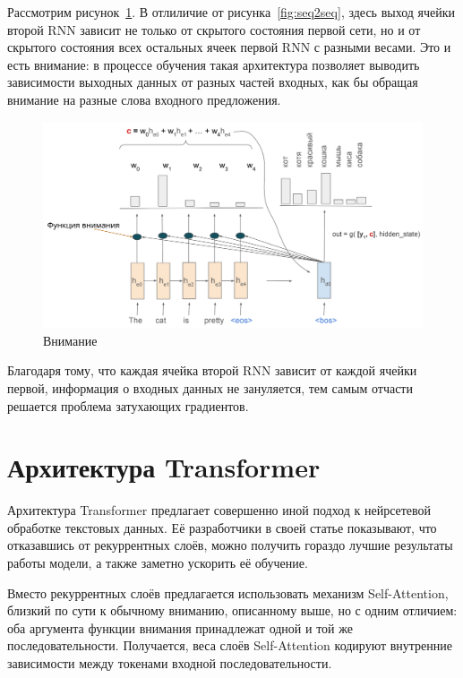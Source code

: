 Рассмотрим рисунок \ref*{fig:attention}. В отлиличие от рисунка \ref*{fig:seq2seq}, здесь выход ячейки второй RNN зависит не только от скрытого состояния первой сети, но и от скрытого состояния всех остальных ячеек первой RNN с разными весами. Это и есть внимание: в процессе обучения такая архитектура позволяет выводить зависимости выходных данных от разных частей входных, как бы обращая внимание на разные слова входного предложения.

\begin{figure}[h]
    \centering
    \includegraphics[width=\textwidth]{../inc/images/attention.png}
    \caption{Внимание}
    \label{fig:attention}
\end{figure}

Благодаря тому, что каждая ячейка второй RNN зависит от каждой ячейки первой, информация о входных данных не зануляется, тем самым отчасти решается проблема затухающих градиентов.

\section{Архитектура Transformer}

Архитектура Transformer предлагает совершенно иной подход к нейрсетевой обработке текстовых данных. Её разработчики в своей статье \cite{art:transformer} показывают, что отказавшись от рекуррентных слоёв, можно получить гораздо лучшие результаты работы модели, а также заметно ускорить её обучение.

Вместо рекуррентных слоёв предлагается использовать механизм Self-Attention, близкий по сути к обычному вниманию, описанному выше, но с одним отличием: оба аргумента функции внимания принадлежат одной и той же последовательности. Получается, веса слоёв Self-Attention кодируют внутренние зависимости между токенами входной последовательности.

